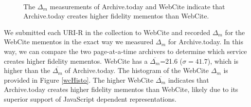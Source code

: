 \begin{figure}[h!]
  \begin{center}
    \\
  \end{center}
  \label{deltaHisto}
  \caption{The $\Delta_m$ measurements of Archive.today and WebCite indicate that Archive.today creates higher fidelity mementos than WebCite.}
\end{figure}



We submitted each URI-R in the collection to WebCite and recorded $\Delta_m$ for the WebCite mementos in the exact way we measured $\Delta_m$ for Archive.today. In this way, we can compare the two page-at-a-time archivers to determine which service creates higher fidelity mementos. WebCite has a $\overline{\Delta_m}$=21.6 ($\sigma=41.7$), which is higher than the $\overline{\Delta_m}$ of Archive.today. The histogram of the WebCite $\Delta_m$ is provided in Figure \ref{wcHisto}. The higher WebCite $\overline{\Delta_m}$ indicates that Archive.today creates higher fidelity mementos than WebCite, likely due to its superior support of JavaScript dependent representations.

